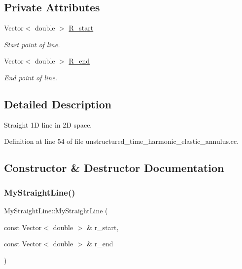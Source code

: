 \subsection*{Private Attributes}
\begin{DoxyCompactItemize}
\item 
Vector$<$ double $>$ \hyperlink{classMyStraightLine_a0f66636dd5d1e7ff6ec93acf90879f0c}{R\+\_\+start}
\begin{DoxyCompactList}\small\item\em Start point of line. \end{DoxyCompactList}\item 
Vector$<$ double $>$ \hyperlink{classMyStraightLine_afa466e12301ccea99a02fe1bde615691}{R\+\_\+end}
\begin{DoxyCompactList}\small\item\em End point of line. \end{DoxyCompactList}\end{DoxyCompactItemize}


\subsection{Detailed Description}
Straight 1D line in 2D space. 

Definition at line 54 of file unstructured\+\_\+time\+\_\+harmonic\+\_\+elastic\+\_\+annulus.\+cc.



\subsection{Constructor \& Destructor Documentation}
\mbox{\label{classMyStraightLine_a2c63e574f21703250a31fc446ab8045d}} 
\subsubsection{\texorpdfstring{My\+Straight\+Line()}{MyStraightLine()}\hspace{0.1cm}{\footnotesize\ttfamily [1/2]}}
{\footnotesize\ttfamily My\+Straight\+Line\+::\+My\+Straight\+Line (\begin{DoxyParamCaption}\item[{const Vector$<$ double $>$ \&}]{r\+\_\+start,  }\item[{const Vector$<$ double $>$ \&}]{r\+\_\+end }\end{DoxyParamCaption})\hspace{0.3cm}{\ttfamily [inline]}}



